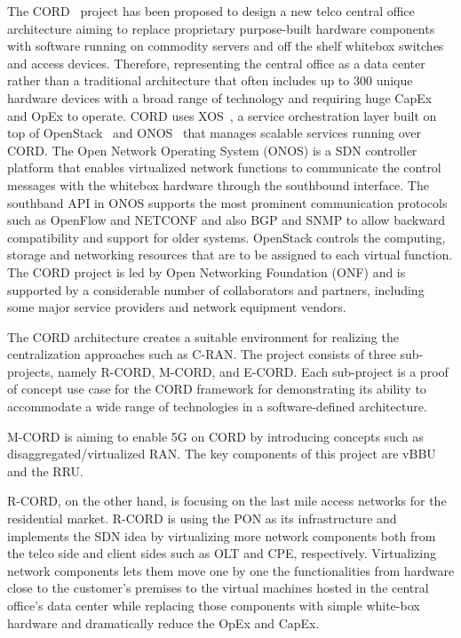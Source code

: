 The \ac{CORD}~\cite{7588276} project has been proposed to design a new telco central office architecture aiming to replace proprietary purpose-built hardware components with software running on commodity servers and off the shelf whitebox switches and access devices. Therefore, representing the central office as a data center rather than a traditional architecture that often includes up to 300 unique hardware devices with a broad range of technology and requiring huge \ac{CapEx} and \ac{OpEx} to operate. \ac{CORD} uses XOS~\cite{XOSUnle92:online}, a service orchestration layer built on top of OpenStack~\cite{OpenStack:online} and ONOS~\cite{berde2014onos} that manages scalable services running over \ac{CORD}. 
The Open Network Operating System (ONOS) is a \ac{SDN} controller platform that enables virtualized network functions to communicate the control messages with the whitebox hardware through the southbound interface. The southband API in ONOS supports the most prominent communication protocols such as OpenFlow and NETCONF and also \ac{BGP} and \ac{SNMP} to allow backward compatibility and support for older systems. OpenStack controls the computing, storage and networking resources that are to be assigned to each virtual function. 
The \ac{CORD} project is led by Open Networking Foundation (ONF) and is supported by a considerable number of collaborators and partners, including some major service providers and network equipment vendors.

The \ac{CORD} architecture creates a suitable environment for realizing the centralization approaches such as \ac{C-RAN}. The project consists of three sub-projects, namely \ac{R-CORD}, \ac{M-CORD}, and \ac{E-CORD}. Each sub-project is a proof of concept use case for the \ac{CORD} framework for demonstrating its ability to accommodate a wide range of technologies in a software-defined architecture.

\ac{M-CORD} is aiming to enable \ac{5G} on \ac{CORD} by introducing concepts such as disaggregated/virtualized \ac{RAN}. The key components of this project are \ac{vBBU} and the \ac{RRU}.

\ac{R-CORD}, on the other hand, is focusing on the last mile access networks for the residential market. \ac{R-CORD} is using the \ac{PON} as its infrastructure and implements the \ac{SDN} idea by virtualizing more network components both from the telco side and client sides such as \ac{OLT} and \ac{CPE}, respectively. Virtualizing network components lets them move one by one the functionalities from hardware close to the customer's premises to the virtual machines hosted in the central office's data center while replacing those components with simple white-box hardware and dramatically reduce the \ac{OpEx} and \ac{CapEx}.
